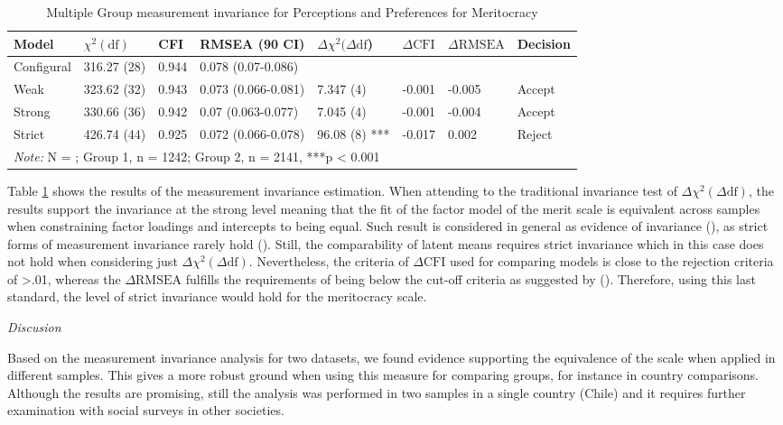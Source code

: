 \documentclass[
  10pt,
  a4paper,
]{article}
\begin{document}
\begin{table}[H]

\caption{\label{tab:invargroup}Multiple Group measurement invariance for Perceptions and Preferences for Meritocracy}
\centering
\fontsize{10}{12}\selectfont
\begin{tabular}[t]{llllllll}
\toprule
Model & $\chi^2 (\text{df})$ & CFI & RMSEA (90 CI) & $\Delta \chi^2 (\Delta \text{df}$) & $\Delta \text{CFI}$ & $\Delta \text{RMSEA}$ & Decision\\
\midrule
Configural & 316.27 (28) & 0.944 & 0.078 
 (0.07-0.086) &  &  &  & \\
Weak & 323.62 (32) & 0.943 & 0.073 
 (0.066-0.081) & 7.347 (4) & -0.001 & -0.005 & Accept\\
Strong & 330.66 (36) & 0.942 & 0.07 
 (0.063-0.077) & 7.045 (4) & -0.001 & -0.004 & Accept\\
Strict & 426.74 (44) & 0.925 & 0.072 
 (0.066-0.078) & 96.08 (8) *** & -0.017 & 0.002 & Reject\\
\bottomrule
\multicolumn{8}{l}{\rule{0pt}{1em}\textit{Note: } N = ; Group 1, n = 1242; Group 2, n = 2141, ***p < 0.001}\\
\end{tabular}
\end{table}

Table \ref{tab:invargroup} shows the results of the measurement invariance estimation. When attending to the traditional invariance test of \(\Delta \chi^2 (\Delta \text{df})\), the results support the invariance at the strong level meaning that the fit of the factor model of the merit scale is equivalent across samples when constraining factor loadings and intercepts to being equal. Such result is considered in general as evidence of invariance (), as strict forms of measurement invariance rarely hold (). Still, the comparability of latent means requires strict invariance which in this case does not hold when considering just \(\Delta \chi^2 (\Delta \text{df})\). Nevertheless, the criteria of \(\Delta \text{CFI}\) used for comparing models is close to the rejection criteria of \textgreater.01, whereas the \(\Delta \text{RMSEA}\) fulfills the requirements of being below the cut-off criteria as suggested by (). Therefore, using this last standard, the level of strict invariance would hold for the meritocracy scale.

\emph{Discusion}

Based on the measurement invariance analysis for two datasets, we found evidence supporting the equivalence of the scale when applied in different samples. This gives a more robust ground when using this measure for comparing groups, for instance in country comparisons. Although the results are promising, still the analysis was performed in two samples in a single country (Chile) and it requires further examination with social surveys in other societies.
\end{document}
